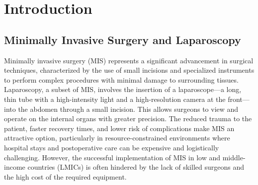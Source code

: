 \section{Introduction}


\subsection{Minimally Invasive Surgery and Laparoscopy}

Minimally invasive surgery (MIS) represents a significant advancement in surgical techniques, characterized by the use of small incisions and specialized instruments to perform complex procedures with minimal damage to surrounding tissues. Laparoscopy, a subset of MIS, involves the insertion of a laparoscope—a long, thin tube with a high-intensity light and a high-resolution camera at the front—into the abdomen through a small incision. This allows surgeons to view and operate on the internal organs with greater precision. The reduced trauma to the patient, faster recovery times, and lower risk of complications make MIS an attractive option, particularly in resource-constrained environments where hospital stays and postoperative care can be expensive and logistically challenging. However, the successful implementation of MIS in low and middle-income countries (LMICs) is often hindered by the lack of skilled surgeons and the high cost of the required equipment.


